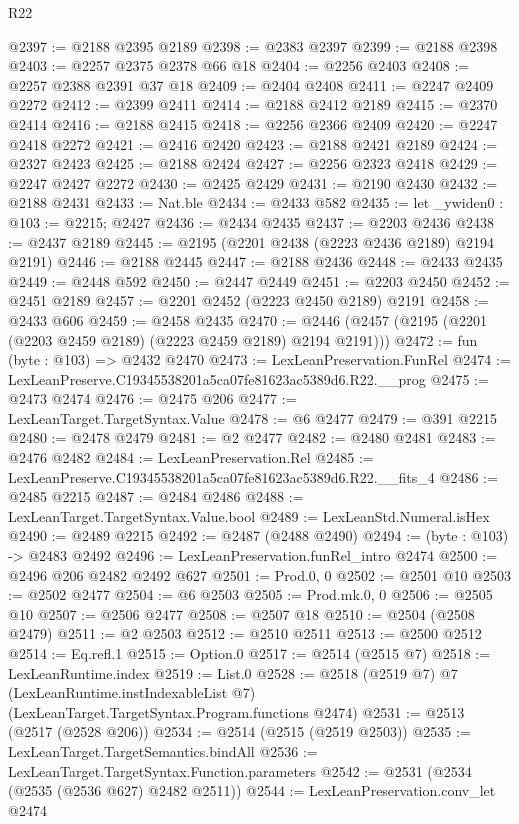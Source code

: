 \begin{lexlean}{R22}
\begin{coremodule}
@2397 := @2188 @2395 @2189
@2398 := @2383 @2397
@2399 := @2188 @2398
@2403 := @2257 @2375 @2378 @66 @18
@2404 := @2256 @2403
@2408 := @2257 @2388 @2391 @37 @18
@2409 := @2404 @2408
@2411 := @2247 @2409 @2272
@2412 := @2399 @2411
@2414 := @2188 @2412 @2189
@2415 := @2370 @2414
@2416 := @2188 @2415
@2418 := @2256 @2366 @2409
@2420 := @2247 @2418 @2272
@2421 := @2416 @2420
@2423 := @2188 @2421 @2189
@2424 := @2327 @2423
@2425 := @2188 @2424
@2427 := @2256 @2323 @2418
@2429 := @2247 @2427 @2272
@2430 := @2425 @2429
@2431 := @2190 @2430
@2432 := @2188 @2431
@2433 := Nat.ble
@2434 := @2433 @582
@2435 := let _ywiden0 : @103 := @2215; @2427
@2436 := @2434 @2435
@2437 := @2203 @2436
@2438 := @2437 @2189
@2445 := @2195 (@2201 @2438 (@2223 @2436 @2189) @2194 @2191)
@2446 := @2188 @2445
@2447 := @2188 @2436
@2448 := @2433 @2435
@2449 := @2448 @592
@2450 := @2447 @2449
@2451 := @2203 @2450
@2452 := @2451 @2189
@2457 := @2201 @2452 (@2223 @2450 @2189) @2191
@2458 := @2433 @606
@2459 := @2458 @2435
@2470 := @2446 (@2457 (@2195 (@2201 (@2203 @2459 @2189) (@2223 @2459 @2189) @2194 @2191)))
@2472 := fun (byte : @103) => @2432 @2470
@2473 := LexLeanPreservation.FunRel
@2474 := LexLeanPreserve.C19345538201a5ca07fe81623ac5389d6.R22.__prog
@2475 := @2473 @2474
@2476 := @2475 @206
@2477 := LexLeanTarget.TargetSyntax.Value
@2478 := @6 @2477
@2479 := @391 @2215
@2480 := @2478 @2479
@2481 := @2 @2477
@2482 := @2480 @2481
@2483 := @2476 @2482
@2484 := LexLeanPreservation.Rel
@2485 := LexLeanPreserve.C19345538201a5ca07fe81623ac5389d6.R22.__fits_4
@2486 := @2485 @2215
@2487 := @2484 @2486
@2488 := LexLeanTarget.TargetSyntax.Value.bool
@2489 := LexLeanStd.Numeral.isHex
@2490 := @2489 @2215
@2492 := @2487 (@2488 @2490)
@2494 := (byte : @103) -> @2483 @2492
@2496 := LexLeanPreservation.funRel_intro @2474
@2500 := @2496 @206 @2482 @2492 @627
@2501 := Prod.{0, 0}
@2502 := @2501 @10
@2503 := @2502 @2477
@2504 := @6 @2503
@2505 := Prod.mk.{0, 0}
@2506 := @2505 @10
@2507 := @2506 @2477
@2508 := @2507 @18
@2510 := @2504 (@2508 @2479)
@2511 := @2 @2503
@2512 := @2510 @2511
@2513 := @2500 @2512
@2514 := Eq.refl.{1}
@2515 := Option.{0}
@2517 := @2514 (@2515 @7)
@2518 := LexLeanRuntime.index
@2519 := List.{0}
@2528 := @2518
    (@2519 @7)
    @7
    (LexLeanRuntime.instIndexableList @7)
    (LexLeanTarget.TargetSyntax.Program.functions @2474)
@2531 := @2513 (@2517 (@2528 @206))
@2534 := @2514 (@2515 (@2519 @2503))
@2535 := LexLeanTarget.TargetSemantics.bindAll
@2536 := LexLeanTarget.TargetSyntax.Function.parameters
@2542 := @2531 (@2534 (@2535 (@2536 @627) @2482 @2511))
@2544 := LexLeanPreservation.conv_let @2474

\end{coremodule}
\end{lexlean}

